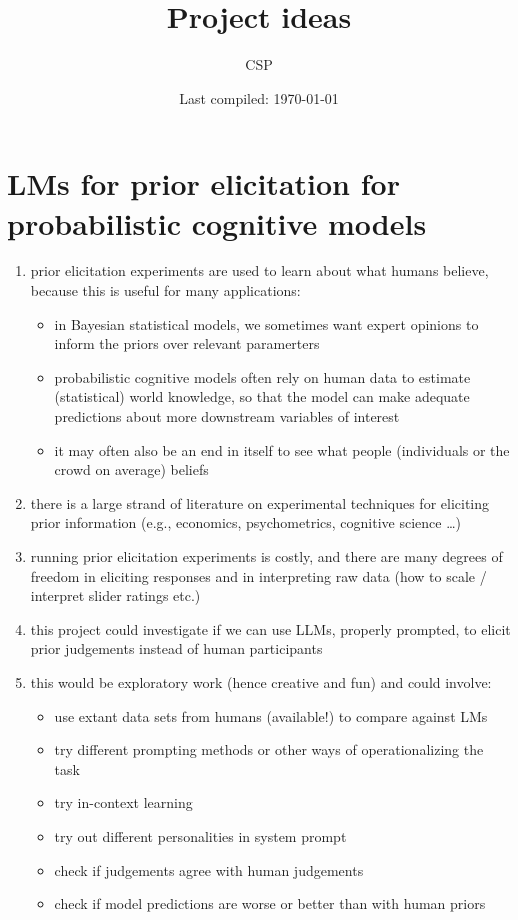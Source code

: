 \documentclass[fleqn,reqno,10pt]{article}
\title{Project ideas}
\author{CSP}
\date{Last compiled: \today}
\begin{document}
\maketitle

\section{LMs for prior elicitation for probabilistic cognitive models}

\begin{enumerate}
  \item prior elicitation experiments are used to learn about what humans believe, because this is useful for many applications:
  \begin{itemize}
    \item in Bayesian statistical models, we sometimes want expert opinions to inform the priors over relevant paramerters
    \item probabilistic cognitive models often rely on human data to estimate (statistical) world knowledge, so that the model can make adequate predictions about more downstream variables of interest
    \item it may often also be an end in itself to see what people (individuals or the crowd on average) beliefs
  \end{itemize}
  \item there is a large strand of literature on experimental techniques for eliciting prior information (e.g., economics, psychometrics, cognitive science \dots)
  \item running prior elicitation experiments is costly, and there are many degrees of freedom in eliciting responses and in interpreting raw data (how to scale / interpret slider ratings etc.)
  \item this project could investigate if we can use LLMs, properly prompted, to elicit prior judgements instead of human participants
  \item this would be exploratory work (hence creative and fun) and could involve:
  \begin{itemize}
    \item use extant data sets from humans (available!) to compare against LMs
    \item try different prompting methods or other ways of operationalizing the task
    \item try in-context learning
    \item try out different personalities in system prompt
    \item check if judgements agree with human judgements
    \item check if model predictions are worse or better than with human priors
  \end{itemize}
\end{enumerate}
\end{document}
